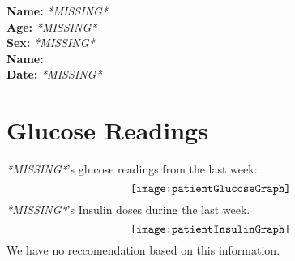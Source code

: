 \documentclass{article}
\newcommand{\missingText}{\emph{*MISSING*}}
\providecommand{\patientName}{\missingText}
\providecommand{\patientSex}{\missingText}
\newcommand{\noRecommendation}{We have no reccomendation based on this information.}
\providecommand{\patientReccomendation}{\noRecommendation}
\providecommand{\patientInsulinGraph}{}
\begin{document}
    \textbf{Name: }\patientName\\
    \textbf{Age: }\patientName\\
    \textbf{Sex: }\patientSex\\
    \textbf{Name: }\patient\\
    \textbf{Date: }\patientName\\
    
    \section{Glucose Readings}
    \patientName{'s} glucose readings from the last week:
    \[
        \texttt{[image: \\patientGlucoseGraph]}
    \]
    \patientName{'s} Insulin doses during the last week.
    \[
        \texttt{[image: \\patientInsulinGraph]}
    \]
    \patientReccomendation
\end{document}
